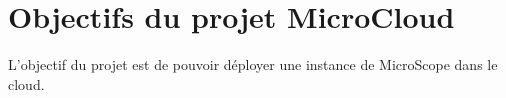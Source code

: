 \section {Objectifs du projet MicroCloud}

L'objectif du projet est de pouvoir déployer une instance de MicroScope dans le cloud.